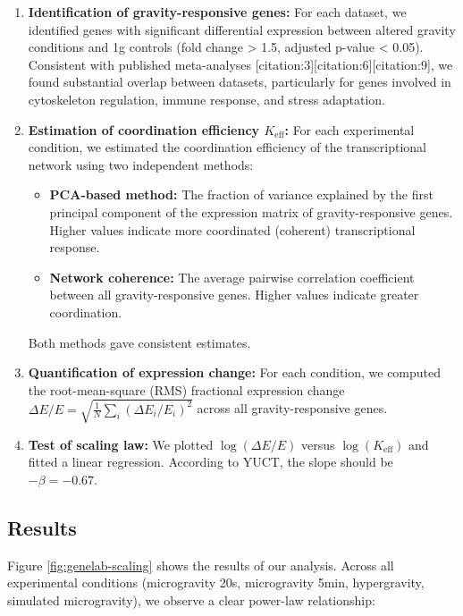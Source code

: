\documentclass[12pt,a4paper]{article}
\theoremstyle{remark}
\newcommand{\Keff}{K_{\mathrm{eff}}}
\begin{document}
	\begin{enumerate}
		\item \textbf{Identification of gravity-responsive genes:} For each dataset, we identified genes with significant differential expression between altered gravity conditions and 1g controls (fold change > 1.5, adjusted p-value < 0.05). Consistent with published meta-analyses [citation:3][citation:6][citation:9], we found substantial overlap between datasets, particularly for genes involved in cytoskeleton regulation, immune response, and stress adaptation.
		
		\item \textbf{Estimation of coordination efficiency \(\Keff\):} For each experimental condition, we estimated the coordination efficiency of the transcriptional network using two independent methods:
		\begin{itemize}
			\item \textbf{PCA-based method:} The fraction of variance explained by the first principal component of the expression matrix of gravity-responsive genes. Higher values indicate more coordinated (coherent) transcriptional response.
			\item \textbf{Network coherence:} The average pairwise correlation coefficient between all gravity-responsive genes. Higher values indicate greater coordination.
		\end{itemize}
		Both methods gave consistent estimates.
		
		\item \textbf{Quantification of expression change:} For each condition, we computed the root-mean-square (RMS) fractional expression change \(\Delta E/E = \sqrt{\frac{1}{N}\sum_i (\Delta E_i/E_i)^2}\) across all gravity-responsive genes.
		
		\item \textbf{Test of scaling law:} We plotted \(\log(\Delta E/E)\) versus \(\log(\Keff)\) and fitted a linear regression. According to YUCT, the slope should be \(-\beta = -0.67\).
	\end{enumerate}
	
	\subsection{Results}
	
	Figure \ref{fig:genelab-scaling} shows the results of our analysis. Across all experimental conditions (microgravity 20s, microgravity 5min, hypergravity, simulated microgravity), we observe a clear power-law relationship:
	
\end{document}
